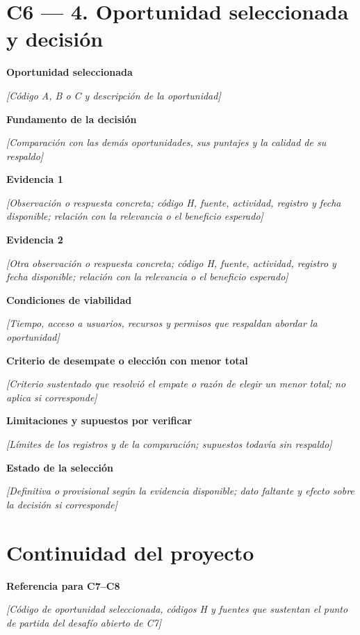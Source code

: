 \documentclass[12pt,a4paper]{article}
\newcommand{\campo}[1]{\textcolor{InstructionColor}{\textit{[#1]}}}
\newcommand{\respuesta}[2]{\par\textbf{#1}\par\campo{#2}\par}
\begin{document}
\section*{C6 --- 4. Oportunidad seleccionada y decisión}
\respuesta{Oportunidad seleccionada}{Código A, B o C y descripción de la oportunidad}
\respuesta{Fundamento de la decisión}{Comparación con las demás oportunidades, sus puntajes y la calidad de su respaldo}
\respuesta{Evidencia 1}{Observación o respuesta concreta; código H, fuente, actividad, registro y fecha disponible; relación con la relevancia o el beneficio esperado}
\respuesta{Evidencia 2}{Otra observación o respuesta concreta; código H, fuente, actividad, registro y fecha disponible; relación con la relevancia o el beneficio esperado}
\respuesta{Condiciones de viabilidad}{Tiempo, acceso a usuarios, recursos y permisos que respaldan abordar la oportunidad}
\respuesta{Criterio de desempate o elección con menor total}{Criterio sustentado que resolvió el empate o razón de elegir un menor total; no aplica si corresponde}
\respuesta{Limitaciones y supuestos por verificar}{Límites de los registros y de la comparación; supuestos todavía sin respaldo}
\respuesta{Estado de la selección}{Definitiva o provisional según la evidencia disponible; dato faltante y efecto sobre la decisión si corresponde}

\section*{Continuidad del proyecto}
\respuesta{Referencia para C7--C8}{Código de oportunidad seleccionada, códigos H y fuentes que sustentan el punto de partida del desafío abierto de C7}
\end{document}

